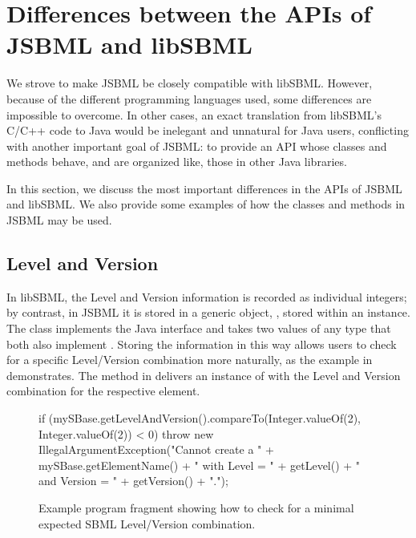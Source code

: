 
\section{Differences between the APIs of JSBML and libSBML}
\label{sec:api-differences}

We strove to make JSBML be closely compatible with libSBML. However,
because of the different programming languages used,
some differences are impossible to overcome.
In other cases, an exact translation from libSBML's C/C++ 
code to Java would be inelegant and unnatural for Java users,
conflicting with another important goal of JSBML: to provide
an API  whose classes and
methods behave, and are organized like, those in other Java libraries.

In this section, we discuss the most important differences in the APIs of
JSBML  and libSBML.
 We also provide some
examples of how the classes and methods in JSBML may be used.


\subsection{Level and Version }

In libSBML, the Level and Version information is recorded as individual
integers; by contrast, in JSBML it is stored in a generic object, \ValuePair,
stored within an \AbstractSBase instance. The class \ValuePair implements the
Java interface \Comparable and takes two values of any type that both also
implement \Comparable.  Storing the information in this way allows users to
check for a specific Level/Version combination more naturally, as the example
in  demonstrates. The method
 in \AbstractSBase delivers an instance of
\ValuePair with the Level and Version combination for the respective element.

\begin{figure}[bh]%
  \begin{example}
if (mySBase.getLevelAndVersion().compareTo(Integer.valueOf(2), Integer.valueOf(2)) < 0) {
  throw new IllegalArgumentException("Cannot create a " + mySBase.getElementName() + 
  		" with Level = " + getLevel() + " and Version = " + getVersion() + ".");
}\end{example}
  \caption{Example program fragment showing how to check for a minimal
    expected SBML Level/Version combination.}
  \label{fig:LevelVersionCheck}
\end{figure}


